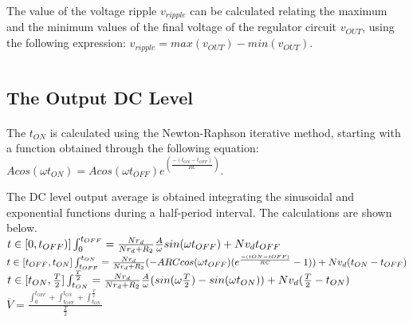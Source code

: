 The value of the voltage ripple $v_{ripple}$ can be calculated relating the maximum and the minimum values of the final voltage of the regulator circuit $v_{OUT}$, using the following expression: $v_{ripple}=max(v_{OUT})-min(v_{OUT})$.

\begin{center}
   \begin{tabular}{|c||c|}
      \hline
        
   \end{tabular}
 \end{center}

\subsection{The Output DC Level}
\label{subsec:dclevel}

\paragraph{}
The $t_{ON}$ is calculated using the Newton-Raphson iterative method, starting with a function obtained through the following equation: $Acos(\omega t_{ON})=Acos(\omega t_{OFF})e^(\frac{-(t_{ON}-t_{OFF})}{RC})$.

The DC level output average is obtained integrating the sinusoidal and exponential functions during a half-period interval. The calculations are shown below.\\

$t\in[0,t_{OFF})]\\
\int_{0}^{t_{OFF}}=\frac{N r_d}{N r_d + R_2}\frac{A}{\omega}sin(\omega t_{OFF})+N v_d t_{OFF}\\$\\

$t\in[t_{OFF},t_{ON}]\\
\int_{t_{OFF}}^{t_{ON}}=\frac{N r_d}{N r_d + R_2}(-A R C cos(\omega t_{OFF})(e^{\frac{-({tON}-{tOFF})}{RC}}-1))+N v_d (t_{ON} - t_{OFF})\\$\\

$t\in[t_{ON},\frac{T}{2}]\\
\int_{t_{ON}}^{\frac{T}{2}}=\frac{N r_d}{N r_d + R_2}\frac{A}{\omega}(sin(\omega \frac{T}{2})-sin(\omega t_{ON}))+N v_d (\frac{T}{2}-t_{ON})\\$\\

$\overline{V}=\frac{\int_{0}^{t_{OFF}}+\int_{t_{OFF}}^{t_{ON}}+\int_{t_{ON}}^{\frac{T}{2}}}{\frac{T}{2}}$

